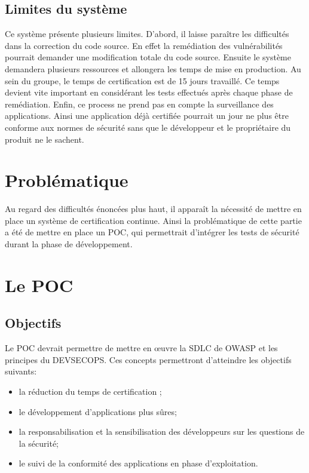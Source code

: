 \documentclass[a4paper,12pt]{book}
\theoremstyle{break}
\begin{document}
\subsection{Limites du système}
Ce système présente plusieurs limites. D'abord, il laisse paraître les difficultés dans la correction du code source. En effet la remédiation des vulnérabilités pourrait demander une modification totale du code source. 
\newline
Ensuite le système demandera plusieurs ressources et allongera les temps de mise en production. Au sein du groupe, le temps de certification est de 15 jours travaillé. 
Ce temps devient vite important en considérant les tests effectués après chaque phase de remédiation.
\newline 
Enfin, ce process ne prend pas en compte la surveillance des applications. Ainsi une application déjà certifiée pourrait un jour ne plus être conforme aux normes de sécurité sans que le développeur et le propriétaire du produit ne le sachent. 


\section{Problématique}
Au regard des difficultés énoncées plus haut, il apparaît la nécessité de mettre en place un système de certification continue. Ainsi la problématique de cette partie a été de mettre en place un POC, qui permettrait d'intégrer les tests de sécurité durant la phase de développement. 

\section{Le POC}
\subsection{Objectifs}
Le POC devrait permettre de mettre en  œuvre la \ac{SDLC} de \ac{OWASP} et les principes du  \ac{DEVSECOPS}. Ces concepts permettront d'atteindre les objectifs suivants:
\begin{itemize}
    \item la réduction du temps de certification ;
    \item le développement d'applications plus sûres;
    \item la responsabilisation et la sensibilisation des développeurs sur les questions de la sécurité; 
    \item le suivi de la conformité des applications en phase d'exploitation. 
    
\end{itemize}
\end{document}

